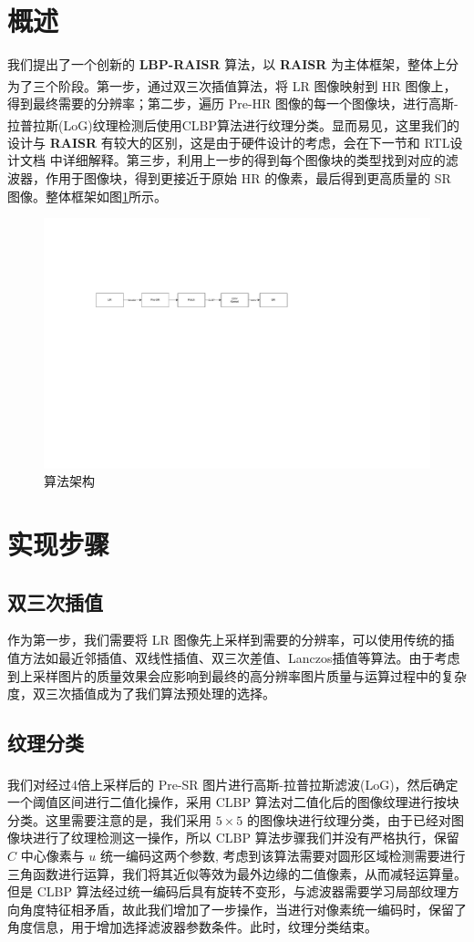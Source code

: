 \documentclass[12pt, a4paper, oneside]{ctexbook}
\begin{document}
	\section{概述}
	我们提出了一个创新的 \textbf{LBP-RAISR} 算法，以 \textbf{RAISR} 为主体框架，整体上分为了三个阶段。第一步，通过双三次插值算法\textsuperscript{\cite{4}\cite{5}}，将 LR 图像映射到 HR 图像上，得到最终需要的分辨率；第二步，遍历 Pre-HR 图像的每一个图像块，进行高斯-拉普拉斯(LoG)纹理检测后使用CLBP算法\textsuperscript{\cite{8}\cite{9}}进行纹理分类。显而易见，这里我们的设计与 \textbf{RAISR} 有较大的区别，这是由于硬件设计的考虑，会在下一节和 RTL设计文档 中详细解释。第三步，利用上一步的得到每个图像块的类型找到对应的滤波器，作用于图像块，得到更接近于原始 HR 的像素，最后得到更高质量的 SR 图像。整体框架如图\ref{overview}所示。
	\begin{figure}[h]
		\centering
		\includegraphics[scale=0.72]{./pic/overview.pdf}
		\caption{算法架构}
		\label{overview}
	\end{figure}
	\section{实现步骤}
	\subsection{双三次插值}
	作为第一步，我们需要将 LR 图像先上采样到需要的分辨率，可以使用传统的插值方法如最近邻插值、双线性插值、双三次差值、Lanczos插值等算法。由于考虑到上采样图片的质量效果会应影响到最终的高分辨率图片质量与运算过程中的复杂度，双三次插值成为了我们算法预处理的选择。
	\subsection{纹理分类}
	我们对经过4倍上采样后的 Pre-SR 图片进行高斯-拉普拉斯滤波(LoG)\textsuperscript{\cite{12}}，然后确定一个阈值区间进行二值化操作，采用 CLBP 算法对二值化后的图像纹理进行按块分类。这里需要注意的是，我们采用 $5 \times 5$ 的图像块进行纹理分类，由于已经对图像块进行了纹理检测这一操作，所以 CLBP 算法步骤我们并没有严格执行，保留 $C$ 中心像素与 $u$ 统一编码这两个参数, 考虑到该算法需要对圆形区域检测需要进行三角函数进行运算，我们将其近似等效为最外边缘的二值像素，从而减轻运算量。但是 CLBP 算法经过统一编码后具有旋转不变形，与滤波器需要学习局部纹理方向角度特征相矛盾，故此我们增加了一步操作，当进行对像素统一编码时，保留了角度信息，用于增加选择滤波器参数条件。此时，纹理分类结束。
\end{document}
